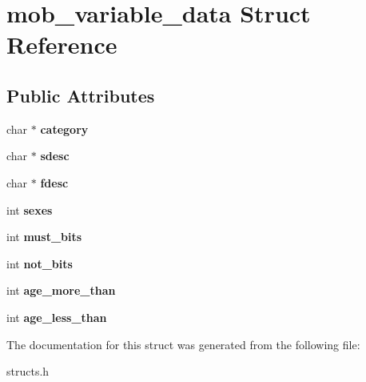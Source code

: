 \hypertarget{structmob__variable__data}{\section{mob\-\_\-variable\-\_\-data Struct Reference}
\label{structmob__variable__data}
}
\subsection*{Public Attributes}
\begin{DoxyCompactItemize}
\item 
\hypertarget{structmob__variable__data_a3edcc3f6f3808c9ab9494af951068537}{char $\ast$ {\bfseries category}}\label{structmob__variable__data_a3edcc3f6f3808c9ab9494af951068537}

\item 
\hypertarget{structmob__variable__data_af28c60cdb72077656863dcf5dc66e6f1}{char $\ast$ {\bfseries sdesc}}\label{structmob__variable__data_af28c60cdb72077656863dcf5dc66e6f1}

\item 
\hypertarget{structmob__variable__data_a08e2b2ce07fcbbd4bb86c9fb2f359298}{char $\ast$ {\bfseries fdesc}}\label{structmob__variable__data_a08e2b2ce07fcbbd4bb86c9fb2f359298}

\item 
\hypertarget{structmob__variable__data_a5a29910a8dcff5aaa22ad293a0206b21}{int {\bfseries sexes}}\label{structmob__variable__data_a5a29910a8dcff5aaa22ad293a0206b21}

\item 
\hypertarget{structmob__variable__data_a67ba1cd09055d14386032befcfded821}{int {\bfseries must\-\_\-bits}}\label{structmob__variable__data_a67ba1cd09055d14386032befcfded821}

\item 
\hypertarget{structmob__variable__data_a7f6452ec387fdd6bc38850899d1355a1}{int {\bfseries not\-\_\-bits}}\label{structmob__variable__data_a7f6452ec387fdd6bc38850899d1355a1}

\item 
\hypertarget{structmob__variable__data_ad34ae70026755d59697750306249285d}{int {\bfseries age\-\_\-more\-\_\-than}}\label{structmob__variable__data_ad34ae70026755d59697750306249285d}

\item 
\hypertarget{structmob__variable__data_a607ec2011570ec31b0c8ad26ab7b645d}{int {\bfseries age\-\_\-less\-\_\-than}}\label{structmob__variable__data_a607ec2011570ec31b0c8ad26ab7b645d}

\end{DoxyCompactItemize}


The documentation for this struct was generated from the following file\-:\begin{DoxyCompactItemize}
\item 
structs.\-h\end{DoxyCompactItemize}
